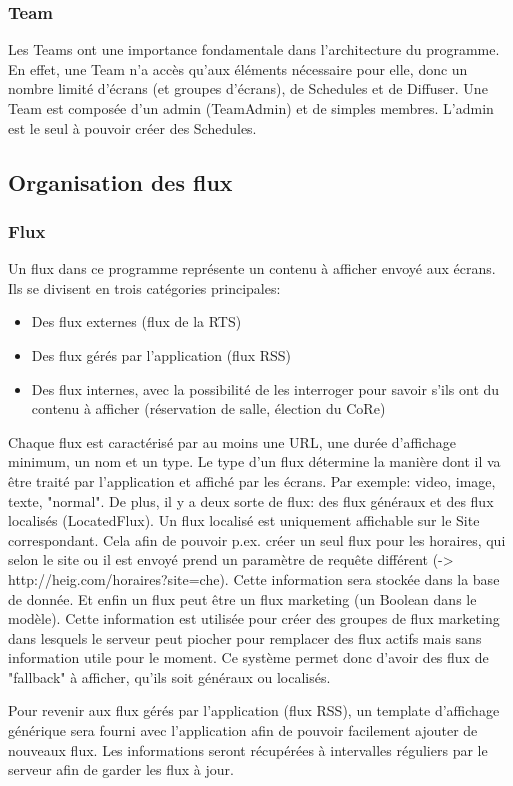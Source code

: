 \documentclass[french]{article}
\begin{document}
\subsubsection{Team}
Les Teams ont une importance fondamentale dans l'architecture du programme. En effet, une Team n'a accès qu'aux éléments nécessaire pour elle, donc un nombre limité d'écrans (et groupes d'écrans), de Schedules et de Diffuser. Une Team est composée d'un admin (TeamAdmin) et de simples membres. L'admin est le seul à pouvoir créer des Schedules.

\subsection{Organisation des flux}

\subsubsection{Flux}
Un flux dans ce programme représente un contenu à afficher envoyé aux écrans. Ils se divisent en trois catégories principales:
\begin{itemize}
	\item Des flux externes (flux de la RTS)
	\item Des flux gérés par l'application (flux RSS)
	\item Des flux internes, avec la possibilité de les interroger pour savoir s'ils ont du contenu à afficher (réservation de salle, élection du CoRe) 
\end{itemize}
Chaque flux est caractérisé par au moins une URL, une durée d'affichage minimum, un nom et un type. Le type d'un flux détermine la manière dont il va être traité par l'application et affiché par les écrans. Par exemple: video, image, texte, "normal".\newline
De plus, il y a deux sorte de flux: des flux généraux et des flux localisés (LocatedFlux). Un flux localisé est uniquement affichable sur le Site correspondant. Cela afin de pouvoir p.ex. créer un seul flux pour les horaires, qui selon le site ou il est envoyé prend un paramètre de requête différent (-> http://heig.com/horaires?site=che). Cette information sera stockée dans la base de donnée. \newline
Et enfin un flux peut être un flux marketing (un Boolean dans le modèle). Cette information est utilisée pour créer des groupes de flux marketing dans lesquels le serveur peut piocher pour remplacer des flux actifs mais sans information utile pour le moment. Ce système permet donc d'avoir des flux de "fallback" à afficher, qu'ils soit généraux ou localisés. \newline \par
Pour revenir aux flux gérés par l'application (flux RSS), un template d'affichage générique sera fourni avec l'application afin de pouvoir facilement ajouter de nouveaux flux. Les informations seront récupérées à intervalles réguliers par le serveur afin de garder les flux à jour.
\end{document}
